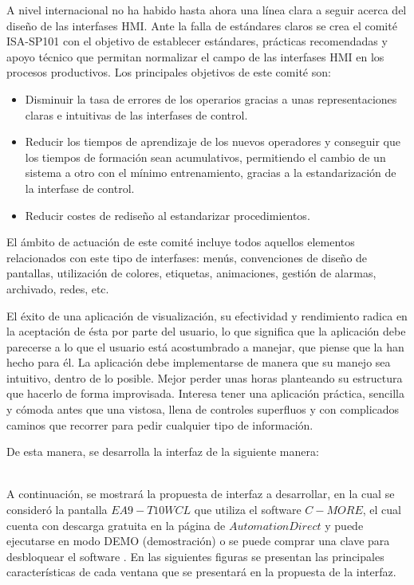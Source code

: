 A nivel internacional no ha habido hasta ahora una línea clara a seguir acerca del diseño de las interfases HMI. Ante la falla de estándares claros se crea el comité ISA-SP101 con el objetivo de establecer estándares, prácticas recomendadas y apoyo técnico que permitan normalizar el campo de las interfases HMI en los procesos productivos. Los principales objetivos de este comité son:
\begin{itemize}
    \item Disminuir la tasa de errores de los operarios gracias a unas representaciones claras e intuitivas de las interfases de control.
    \item Reducir los tiempos de aprendizaje de los nuevos operadores y conseguir que los tiempos de formación sean acumulativos, permitiendo el cambio de un sistema a otro con el mínimo entrenamiento, gracias a la estandarización de la interfase de control.
    \item Reducir costes de rediseño al estandarizar procedimientos.
\end{itemize}

El ámbito de actuación de este comité incluye todos aquellos elementos relacionados con este tipo de interfases: menús, convenciones de diseño de pantallas, utilización de colores, etiquetas, animaciones, gestión de alarmas, archivado, redes, etc.

El éxito de una aplicación de visualización, su efectividad y rendimiento radica en la aceptación de ésta por parte del usuario, lo que significa que la aplicación debe parecerse a lo que el usuario está acostumbrado a manejar, que piense que la han hecho para él. La aplicación debe implementarse de manera que su manejo sea intuitivo, dentro de lo posible. Mejor perder unas horas planteando su estructura que hacerlo de forma improvisada. Interesa tener una aplicación práctica, sencilla y cómoda antes que una vistosa, llena de controles superfluos y con complicados caminos que recorrer para pedir cualquier tipo de información.

De esta manera, se desarrolla la interfaz de la siguiente manera:

\\
A continuación, se mostrará la propuesta de interfaz a desarrollar, en la cual se consideró la pantalla $ EA9-T10WCL $ que utiliza el software $ C-MORE $, el cual cuenta con descarga gratuita en la página de $ AutomationDirect $ y puede ejecutarse en modo DEMO (demostración) o se puede comprar una clave para desbloquear el software \cite{DDI1}.
\newline
En las siguientes figuras se presentan las principales características de cada ventana que se presentará en la propuesta de la interfaz. \newline

